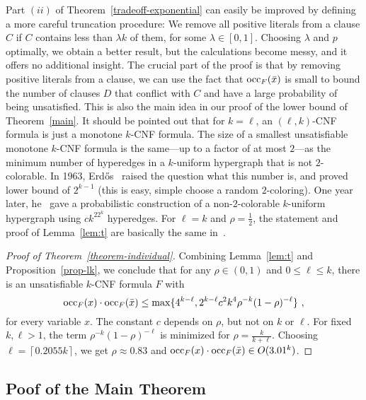 \documentclass[a4paper, 11pt]{article}
\newcommand{\occ}{\ensuremath{{\rm{occ}}}}
\begin{document}
Part $(ii)$ of Theorem~\ref{tradeoff-exponential} can easily be improved
by defining a more careful truncation procedure: We remove all
positive literals from a clause $C$ if $C$ contains less than $\lambda
k$ of them, for some $\lambda \in [0,1]$. Choosing $\lambda$ and $p$
optimally, we obtain a better result, but the calculations become
messy, and it offers no additional insight. The crucial part of the
proof is that by removing positive literals from a clause, we can use
the fact that $\occ_F(\bar{x})$ is small to bound the number of
clauses $D$ that conflict with $C$ and have a large probability of
being unsatisfied.  This is also the main idea in our proof of the
lower bound of Theorem~\ref{main}.
It should be pointed out that for $k = \ell$, an $(\ell,k)$-CNF
formula is just a monotone $k$-CNF formula. The size of a smallest
unsatisfiable monotone $k$-CNF formula is the same---up to a factor of
at most $2$---as the minimum number of hyperedges in a $k$-uniform
hypergraph that is not $2$-colorable. In 1963,
Erd\H{o}s~\cite{Erdos1963} raised the question what this number is,
and proved lower bound of $2^{k-1}$ (this is easy, simple choose a
random $2$-coloring). One year later, he~\cite{Erdos1964} gave a
probabilistic construction of a non-$2$-colorable $k$-uniform
hypergraph using $ck^22^k$ hyperedges. For $\ell=k$ and
$\rho=\frac{1}{2}$, the statement and proof of Lemma~\ref{lem:t} are
basically the same in~\cite{Erdos1964}.


 \begin{proof}[Proof of Theorem~\ref{theorem-individual}]
   Combining Lemma~\ref{lem:t} and Proposition~\ref{prop-lk}, we
   conclude that for any $\rho \in (0,1)$ and $0 \leq \ell \leq k$,
   there is an unsatisfiable $k$-CNF formula $F$ with
   $$
   \occ_F(x) \cdot \occ_F(\bar{x}) \leq
   \max \{4^{k-\ell}, 2^{k-\ell} c^2k^4 \rho^{-k} (1-\rho)^{-\ell}\} \ ,
   $$
   for every variable $x$. The constant $c$ depends on $\rho$, but not
   on $k$ or $\ell$. For fixed $k,\ell>1$, the term $\rho^{-k}
   (1-\rho)^{-\ell}$ is minimized for $\rho = \frac{k}{k+\ell}$.
   Choosing $\ell = \left\lceil 0.2055k\right\rceil$, we get $\rho
   \approx 0.83$ and $\occ_F(x) \cdot \occ_F(\bar{x}) \in O(3.01^k)$.
 \end{proof}

 
 
\subsection{Poof of the Main Theorem}\label{section-lower-bound}
\end{document}
